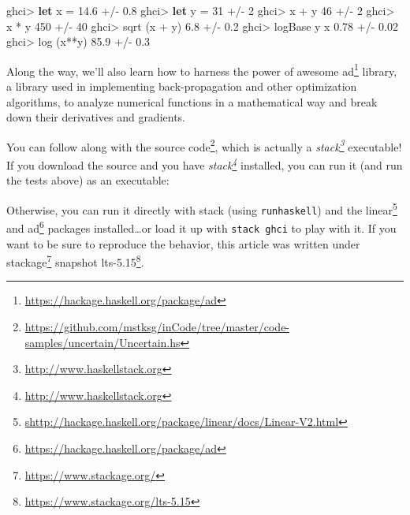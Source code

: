 \documentclass[]{article}
\newenvironment{Shaded}{}{}
\newcommand{\KeywordTok}[1]{\textcolor[rgb]{0.00,0.44,0.13}{\textbf{{#1}}}}
\newcommand{\DecValTok}[1]{\textcolor[rgb]{0.25,0.63,0.44}{{#1}}}
\newcommand{\FloatTok}[1]{\textcolor[rgb]{0.25,0.63,0.44}{{#1}}}
\newcommand{\FunctionTok}[1]{\textcolor[rgb]{0.02,0.16,0.49}{{#1}}}
\newcommand{\NormalTok}[1]{{#1}}
\renewcommand{\href}[2]{#2\footnote{\url{#1}}}
\begin{document}
\begin{Shaded}
\begin{Highlighting}[]
\NormalTok{ghci}\FunctionTok{>} \KeywordTok{let} \NormalTok{x }\FunctionTok{=} \FloatTok{14.6} \FunctionTok{+/-} \FloatTok{0.8}
\NormalTok{ghci}\FunctionTok{>} \KeywordTok{let} \NormalTok{y }\FunctionTok{=} \DecValTok{31}   \FunctionTok{+/-} \DecValTok{2}
\NormalTok{ghci}\FunctionTok{>} \NormalTok{x }\FunctionTok{+} \NormalTok{y}
\DecValTok{46} \FunctionTok{+/-} \DecValTok{2}
\NormalTok{ghci}\FunctionTok{>} \NormalTok{x }\FunctionTok{*} \NormalTok{y}
\DecValTok{450} \FunctionTok{+/-} \DecValTok{40}
\NormalTok{ghci}\FunctionTok{>} \NormalTok{sqrt (x }\FunctionTok{+} \NormalTok{y)}
\FloatTok{6.8} \FunctionTok{+/-} \FloatTok{0.2}
\NormalTok{ghci}\FunctionTok{>} \NormalTok{logBase y x}
\FloatTok{0.78} \FunctionTok{+/-} \FloatTok{0.02}
\NormalTok{ghci}\FunctionTok{>} \NormalTok{log (x}\FunctionTok{**}\NormalTok{y)}
\FloatTok{85.9} \FunctionTok{+/-} \FloatTok{0.3}
\end{Highlighting}
\end{Shaded}

Along the way, we'll also learn how to harness the power of awesome
\href{https://hackage.haskell.org/package/ad}{ad} library, a library
used in implementing back-propagation and other optimization algorithms,
to analyze numerical functions in a mathematical way and break down
their derivatives and gradients.

You can follow along with
\href{https://github.com/mstksg/inCode/tree/master/code-samples/uncertain/Uncertain.hs}{the
source code}, which is actually a
\emph{\href{http://www.haskellstack.org}{stack}} executable! If you
download the source and you have
\emph{\href{http://www.haskellstack.org}{stack}} installed, you can run
it (and run the tests above) as an executable:

\begin{Shaded}
\end{Shaded}

Otherwise, you can run it directly with stack (using
\texttt{runhaskell}) and the
\href{shttp://hackage.haskell.org/package/linear/docs/Linear-V2.html}{linear}
and \href{https://hackage.haskell.org/package/ad}{ad} packages
installed\ldots{}or load it up with \texttt{stack\ ghci} to play with
it. If you want to be sure to reproduce the behavior, this article was
written under \href{https://www.stackage.org/}{stackage} snapshot
\href{https://www.stackage.org/lts-5.15}{lts-5.15}.
\end{document}
